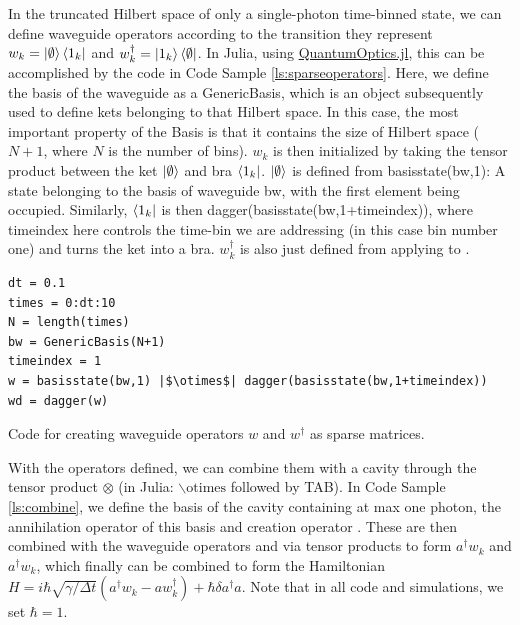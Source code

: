 In the truncated Hilbert space of only a single-photon time-binned state, we can define waveguide operators according to the transition they represent $w_k = \ket{\emptyset} \bra{1_k}$ and $w_k^\dagger = \ket{1_k} \bra{\emptyset}$. In Julia, using \href{https://qojulia.org/}{QuantumOptics.jl}, this can be accomplished by the code in Code Sample \ref{ls:sparseoperators}. Here, we define the basis of the waveguide  as a GenericBasis, which is an object subsequently used to define kets belonging to that Hilbert space. In this case, the most important property of the Basis is that it contains the size of Hilbert space ($N+1$, where $N$ is the number of bins). $w_k$ is then initialized by taking the tensor product between the ket $\ket{\emptyset}$ and bra $\bra{1_k}$. $\ket{\emptyset}$ is defined from {\selectfont basisstate(bw,1)}: A state belonging to the basis of waveguide {\selectfont bw}, with the first element being occupied. Similarly,  $\bra{1_k}$ is then {\selectfont dagger(basisstate(bw,1+timeindex))}, where {\selectfont timeindex} here controls the time-bin we are addressing (in this case bin number one) and  turns the ket into a bra. $w_k^\dagger$ is also just defined from applying  to .
\begin{listing}[H]
\begin{verbatim}
dt = 0.1
times = 0:dt:10
N = length(times)
bw = GenericBasis(N+1)
timeindex = 1
w = basisstate(bw,1) |$\otimes$| dagger(basisstate(bw,1+timeindex))
wd = dagger(w)
\end{verbatim}
\caption{Code for creating waveguide operators $w$ and $w^\dagger$ as sparse matrices.}
\label{ls:sparseoperators}
\end{listing}
With the operators defined, we can combine them with a cavity through the tensor product $\otimes$ (in Julia: $\backslash \mathrm{otimes}$ followed by TAB). In Code Sample \ref{ls:combine}, we define the basis of the cavity  containing at max one photon, the annihilation operator of this basis  and creation operator . These are then combined with the waveguide operators  and  via tensor products to form $a^\dagger w_k$ and $a^\dagger w_k$, which finally can be combined to form the Hamiltonian $H = i \hbar \sqrt{\gamma/\Delta t}(a^\dagger w_k - a w_k^\dagger) +  \hbar \delta a^\dagger a$. Note that in all code and simulations, we set $\hbar = 1$.

